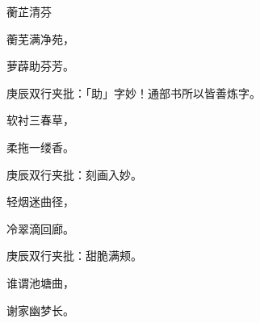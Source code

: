 \begin{poem}

    \begin{pl}蘅芷清芬\end{pl}

    \begin{pl}蘅芜满净苑，\end{pl}

    \begin{pl}萝薜助芬芳。\end{pl}\begin{note}庚辰双行夹批：「助」字妙！通部书所以皆善炼字。\end{note}

    \begin{pl}软衬三春草，\end{pl}

    \begin{pl}柔拖一缕香。\end{pl}\begin{note}庚辰双行夹批：刻画入妙。\end{note}

    \begin{pl}轻烟迷曲径，\end{pl}

    \begin{pl}冷翠滴回廊。\end{pl}\begin{note}庚辰双行夹批：甜脆满颊。\end{note}

    \begin{pl}谁谓池塘曲，\end{pl}

    \begin{pl}谢家幽梦长。\end{pl}

\end{poem}

